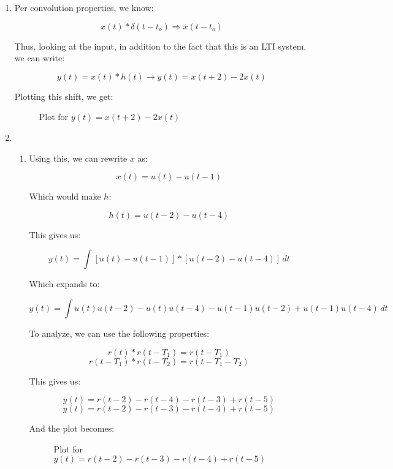 \begin{enumerate}
\begin{enumerate}
    \end{enumerate}

  \item

    Per convolution properties, we know:

    $$x(t)*\delta(t-t_o)\Rightarrow x(t-t_o)$$

    Thus, looking at the input, in addition to the fact that this is an LTI system, we can write:

    $$\boxed{y(t)=x(t)*h(t)\to y(t)=x(t+2)-2x(t)}$$

    Plotting this shift, we get:

    \begin{figure}[H]
      \centering
      
      \caption{Plot for $y(t)=x(t+2)-2x(t)$}
      \label{fig:2}
    \end{figure}

  \item

    \begin{enumerate}

      \item Using this, we can rewrite $x$ as:

        $$x(t)=u(t)-u(t-1)$$

        Which would make $h$:

        $$h(t)=u(t-2)-u(t-4)$$

        This gives us:

        $$y(t)=\int[u(t)-u(t-1)]*[u(t-2)-u(t-4)]\,dt$$

        Which expands to:

        $$y(t)=\int u(t)u(t-2)-u(t)u(t-4)-u(t-1)u(t-2)+u(t-1)u(t-4)\,dt$$

        To analyze, we can use the following properties:

        $$r(t)*r(t-T_1)=r(t-T_1)$$
        $$r(t-T_1)*r(t-T_2)=r(t-T_1-T_2)$$

        This gives us:

        $$y(t)=r(t-2)-r(t-4)-r(t-3)+r(t-5)$$
        $$\boxed{y(t)=r(t-2)-r(t-3)-r(t-4)+r(t-5)}$$

        And the plot becomes:

        \begin{figure}[H]
          \centering
          
          \caption{Plot for $y(t)=r(t-2)-r(t-3)-r(t-4)+r(t-5)$}
          \label{fig:3}
        \end{figure}


\end{enumerate}
\end{enumerate}
